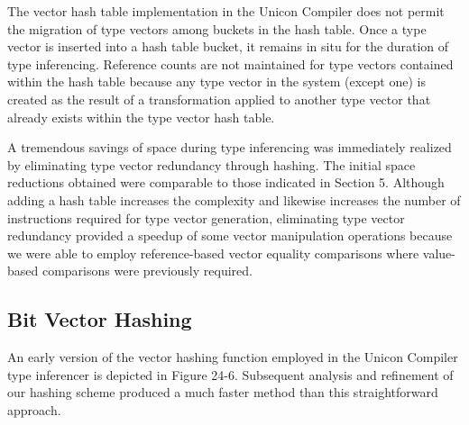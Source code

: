 The vector hash table implementation in the Unicon Compiler does not
permit the migration of type vectors among buckets in the hash
table. Once a type vector is inserted into a hash table bucket, it
remains in situ for the duration of type inferencing. Reference counts
are not maintained for type vectors contained within the hash table
because any type vector in the system (except one) is created as the
result of a transformation applied to another type vector that already
exists within the type vector hash table.

A tremendous savings of space during type inferencing was immediately
realized by eliminating type vector redundancy through hashing. The
initial space reductions obtained were comparable to those indicated
in Section 5. Although adding a hash table increases the complexity
and likewise increases the number of instructions required for type
vector generation, eliminating type vector redundancy provided a
speedup of some vector manipulation operations because we were able to
employ reference-based vector equality comparisons where value-based
comparisons were previously required.

\subsection{Bit Vector Hashing}

An early version of the vector hashing function employed in the Unicon
Compiler type inferencer is depicted in Figure 24-6.  Subsequent analysis
and refinement of our hashing scheme produced a much faster method
than this straightforward approach.

